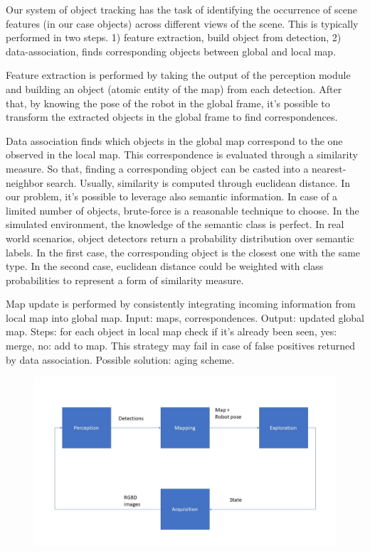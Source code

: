 \documentclass{article}
\begin{document}
	
	Our system of object tracking has the task of identifying the occurrence of scene features (in our case objects) across different views of the scene. This is typically performed in two steps. 1) feature extraction, build object from detection, 2) data-association, finds corresponding objects between global and local map.
	
	Feature extraction is performed by taking the output of the perception module and building an object (atomic entity of the map) from each detection. After that, by knowing the pose of the robot in the global frame, it's possible to transform the extracted objects in the global frame to find correspondences.
	
	Data association finds which objects in the global map correspond to the one observed in the local map. This correspondence is evaluated through a similarity measure. So that, finding a corresponding object can be casted into a nearest-neighbor search. Usually, similarity is computed through euclidean distance. In our problem, it's possible to leverage also semantic information. In case of a limited number of objects, brute-force is a reasonable technique to choose. In the simulated environment, the knowledge of the semantic class is perfect. In real world scenarios, object detectors return a probability distribution over semantic labels. In the first case, the corresponding object is the closest one with the same type. In the second case, euclidean distance could be weighted with class probabilities to represent a form of similarity measure.
	
	Map update is performed by consistently integrating incoming information from local map into global map. Input: maps, correspondences. Output: updated global map. Steps: for each object in local map check if it's already been seen, yes: merge, no: add to map. This strategy may fail in case of false positives returned by data association. Possible solution:  aging scheme.
	 
    \begin{figure}[htbp]
		\centering
		\includegraphics[width=\linewidth]{pics/pipeline}
	\end{figure}	
	
	
	
	
	
\end{document}

